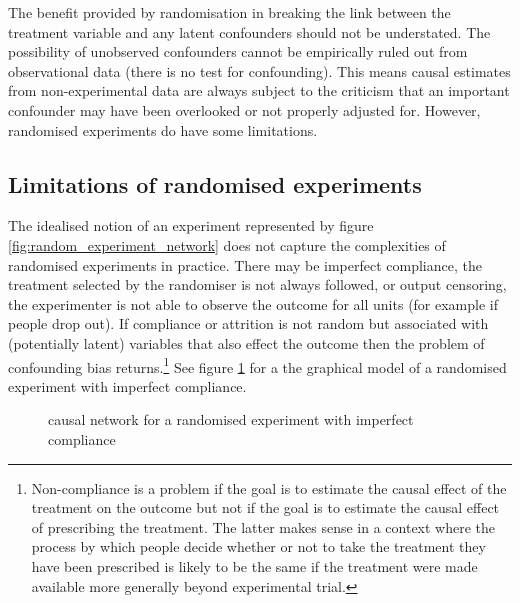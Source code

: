 \documentclass[11pt,a4paper,oneside]{book}
\theoremstyle{plain}
\theoremstyle{definition}
\begin{document}
The benefit provided by randomisation in breaking the link between the treatment variable and any latent confounders should not be understated. The possibility of unobserved confounders cannot be empirically ruled out from observational data \citep{Pearl2000} (there is no test for confounding). This means causal estimates from non-experimental data are always subject to the criticism that an important confounder may have been overlooked or not properly adjusted for. However, randomised experiments do have some limitations. 

\subsection{Limitations of randomised experiments}
\label{subsec:limitations_of_experiment}

The idealised notion of an experiment represented by figure \ref{fig:random_experiment_network} does not capture the complexities of randomised experiments in practice. There may be imperfect compliance, the treatment selected by the randomiser is not always followed, or output censoring, the experimenter is not able to observe the outcome for all units (for example if people drop out). If compliance or attrition is not random but associated with (potentially latent) variables that also effect the outcome then the problem of confounding bias returns.\footnote{Non-compliance is a problem if the goal is to estimate the causal effect of the treatment on the outcome but not if the goal is to estimate the causal effect of prescribing the treatment. The latter makes sense in a context where the process by which people decide whether or not to take the treatment they have been prescribed is likely to be the same if the treatment were made available more generally beyond experimental trial.} See figure \ref{fig:random_experiment_network_imperfect_compliance} for a the graphical model of a randomised experiment with imperfect compliance.

\begin{figure}
\centering
{}
\caption{causal network for a randomised experiment with imperfect compliance}
\label{fig:random_experiment_network_imperfect_compliance}
\end{figure} 
\end{document}
